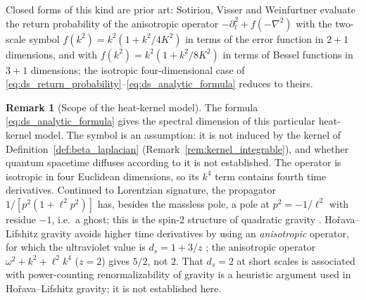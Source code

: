 \documentclass[11pt,a4paper,reqno]{amsart}
\theoremstyle{definition}
\newtheorem{remark}[theorem]{Remark}
\numberwithin{equation}{section}
\begin{document}
Closed forms of this kind are prior art: Sotiriou, Visser and Weinfurtner \cite{sotiriou2011dispersion} evaluate the return probability of the anisotropic operator $-\partial_t^2 + f(-\nabla^2)$ with the two-scale symbol $f(k^2) = k^2(1 + k^2/4K^2)$ in terms of the error function in $2+1$ dimensions, and with $f(k^2) = k^2(1 + k^2/8K^2)$ in terms of Bessel functions in $3+1$ dimensions; the isotropic four-dimensional case of \eqref{eq:ds_return_probability}--\eqref{eq:ds_analytic_formula} reduces to theirs.

\begin{remark}[Scope of the heat-kernel model]
\label{rem:ds_scope}
The formula \eqref{eq:ds_analytic_formula} gives the spectral dimension of this particular heat-kernel model. The symbol is an assumption: it is not induced by the kernel of Definition~\ref{def:beta_laplacian} (Remark~\ref{rem:kernel_integrable}), and whether quantum spacetime diffuses according to it is not established. The operator is isotropic in four Euclidean dimensions, so its $k^4$ term contains fourth time derivatives. Continued to Lorentzian signature, the propagator $1/[p^2(1 + \ell^2 p^2)]$ has, besides the massless pole, a pole at $p^2 = -1/\ell^2$ with residue $-1$, i.e.\ a ghost; this is the spin-2 structure of quadratic gravity \cite{stelle1977renormalization}. Ho\v{r}ava--Lifshitz gravity avoids higher time derivatives by using an \emph{anisotropic} operator, for which the ultraviolet value is $d_s = 1 + 3/z$ \cite{horava2009spectral}; the anisotropic operator $\omega^2 + k^2 + \ell^2 k^4$ ($z = 2$) gives $5/2$, not $2$. That $d_s = 2$ at short scales is associated with power-counting renormalizability of gravity is a heuristic argument used in Ho\v{r}ava--Lifshitz gravity; it is not established here.


\end{remark}
\end{document}
